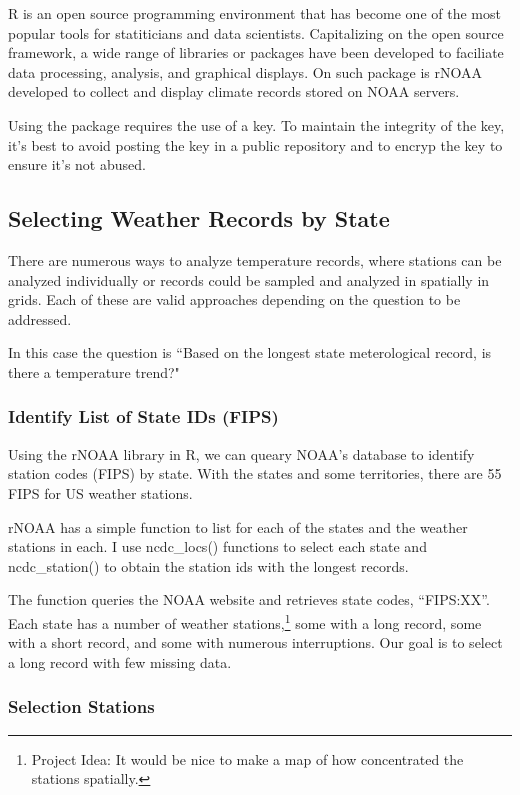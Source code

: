 \documentclass{article}
\begin{document}
R is an open source programming environment that has become one of the most popular tools for statiticians and data scientists. Capitalizing on the open source framework, a wide range of libraries or packages have been developed to faciliate data processing, analysis, and graphical displays. On such package is rNOAA developed to collect and display climate records stored on NOAA servers.

Using the package requires the use of a key. To maintain the integrity of the key, it's best to avoid posting the key in a public repository and to encryp the key to ensure it's not abused. 

\subsection{Selecting Weather Records by State}

There are numerous ways to analyze temperature records, where stations can be analyzed individually or records could be sampled and analyzed in spatially in grids. Each of these are valid approaches depending on the question to be addressed. 

In this case the question is ``Based on the longest state meterological record, is there a temperature trend?"

\subsubsection{Identify List of State IDs (FIPS)}

Using the rNOAA library in R, we can queary NOAA's database to identify station codes (FIPS) by state. With the states and some territories, there are 55 FIPS for US weather stations. 

rNOAA has a simple function to list for each of the states and the weather stations in each. I use ncdc\_locs() functions to select each state and ncdc\_station() to obtain the station ids with the longest records. 



The function queries the NOAA website and retrieves state codes, ``FIPS:XX''. Each state has a number of weather stations,\footnote{Project Idea: It would be nice to make a map of how concentrated the stations spatially.} some with a long record, some with a short record, and some with numerous interruptions. Our goal is to select a long record with few missing data. 

\subsubsection{Selection Stations}
\end{document}
